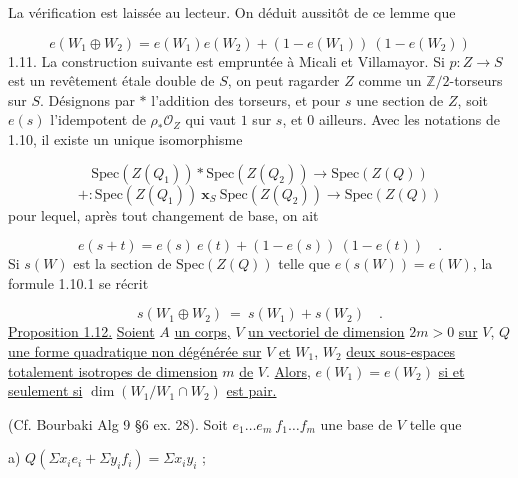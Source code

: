 
La vérification est laissée au lecteur. On déduit aussitôt de ce lemme que

\begin{equation}\tag{1.10.1}
e(W_1 \oplus W_2) = e(W_1)e(W_2) + (1 - e(W_1))\ (1 - e(W_2))
\end{equation}
1.11. La construction suivante est empruntée à Micali et Villamayor. Si $p : Z \longrightarrow S$ est un revêtement étale double de $S$, on peut ragarder $Z$ comme un $\mathbb{Z}/2$-torseurs sur $S$. Désignons par $*$ l'addition des torseurs, et pour $s$ une section de $Z$, soit $e(s)$ l'idempotent de $\rho_* \mathcal{O}_Z$ qui vaut $1$ sur $s$, et $0$ ailleurs. Avec les notations de 1.10, il existe un unique isomorphisme

\begin{equation}\tag{1.11.1}
\mathrm{Spec}(Z(Q_1)) * \mathrm{Spec}(Z(Q_2)) \longrightarrow \mathrm{Spec}(Z(Q))
\end{equation}
\begin{equation*}
+ : \mathrm{Spec}(Z(Q_1))\ \mathbf{x}_S\ \mathrm{Spec}(Z(Q_2)) \longrightarrow \mathrm{Spec}(Z(Q))
\end{equation*}
pour lequel, après tout changement de base, on ait

\begin{equation*}
e(s + t) = e(s)\ e(t) + (1 - e(s))\ (1 - e(t)) \quad .
\end{equation*}
Si $s(W)$ est la section de $\mathrm{Spec}(Z(Q))$ telle que $e(s(W)) = e(W)$, la formule 1.10.1 se récrit

\begin{equation*}
s(W_1 \oplus W_2)\ =\ s(W_1) + s(W_2) \quad .
\end{equation*}
\underline{Proposition 1.12.} \underline{Soient} $A$ \underline{un corps,} $V$ \underline{un vectoriel de dimension} $2m > 0$ \underline{sur} $V$, $Q$ \underline{une forme quadratique non dégénérée sur} $V$ \underline{et} $W_1$, $W_2$ \underline{deux sous-espaces totalement isotropes de dimension} $m$ \underline{de} $V$. \underline{Alors}, $e(W_1) = e(W_2)$ \underline{si et seulement si} $\dim(W_1/W_1 \cap W_2)$ \underline{est pair.}



(Cf. Bourbaki Alg 9 \S 6 ex. 28). Soit $e_1 \dots e_m\ f_1 \dots f_m$ une base de $V$ telle que

a) \qquad $Q( \Sigma x_i e_i + \Sigma y_i f_i) = \Sigma x_i y_i$ ;


